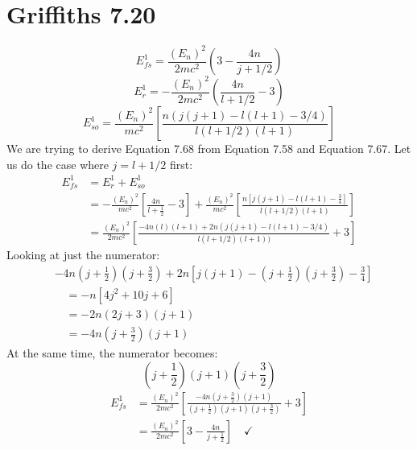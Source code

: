 \documentclass[11pt]{article}
\begin{document}
\section*{Griffiths 7.20}
\begin{equation}
E^1_{fs} = \frac{\left(E_n\right)^2}{2mc^2}\left(3 - \frac{4n}{j+1/2}\right)
\tag{Equation 7.68}
\end{equation}
\begin{equation}
E_r^1 = -\frac{(E_n)^2}{2mc^2}\left(\frac{4n}{l+1/2} - 3\right)
\tag{Equation 7.58}
\end{equation}
\begin{equation}
E^1_{so} = \frac{(E_n)^2}{mc^2}\left[\frac{n(j(j+1)-l(l+1)-3/4)}{l(l+1/2)(l+1)}\right]
\tag{Equation 7.67}
\end{equation}
We are trying to derive Equation 7.68 from Equation 7.58 and Equation 7.67. Let us do the case where $j=l+1/2$ first:
\begin{align*}
E_{fs}^1 &= E_r^1 + E_{so}^1\\
&= -\frac{(E_n)^2}{mc^2}\left[\frac{4n}{l+\frac{1}{2}} -3\right] + \frac{(E_n)^2}{mc^2}\left[\frac{n\left[j(j+1)-l(l+1)-\frac{3}{4}\right]}{l(l+1/2)(l+1)}\right]\\
&= \frac{(E_n)^2}{2mc^2}\left[\frac{-4n(l)(l+1)+2n(j(j+1)-l(l+1)-3/4)}{l(l+1/2)(l+1))}+3\right]
\end{align*}
Looking at just the numerator:
\begin{align*}
&-4n\left(j+\frac{1}{2}\right)\left(j+\frac{3}{2}\right)+2n\left[j(j+1) -\left(j+\frac{1}{2}\right)\left(j+\frac{3}{2}\right)-\frac{3}{4}\right]\\
&\quad = -n\left[4j^2 + 10j+6\right]\\
&\quad = -2n(2j+3)(j+1)\\
&\quad = -4n\left(j+\frac{3}{2}\right)\left(j+1\right)
\end{align*}
At the same time, the numerator becomes:
\[\left(j+\frac{1}{2}\right)(j+1)\left(j+\frac{3}{2}\right)\]
\begin{align*}
E_{fs}^1 & =\frac{(E_n)^2}{2mc^2}\left[\frac{-4n\left(j+\frac{3}{2}\right)(j+1)}{\left(j+\frac{1}{2}\right)(j+1)\left(j+\frac{3}{2}\right)}+3\right]\\
& = \frac{(E_n)^2}{2mc^2}\left[3-\frac{4n}{j+\frac{1}{2}}\right] \quad \checkmark
\end{align*}
\end{document}
